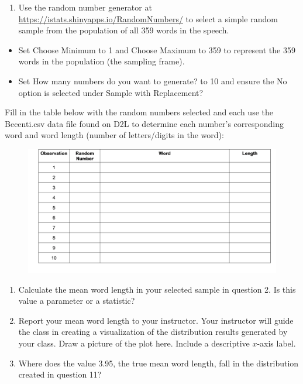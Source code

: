 \documentclass[
]{report}
\providecommand{\tightlist}{%
  \setlength{\itemsep}{0pt}\setlength{\parskip}{0pt}}
\begin{document}
\begin{enumerate}
\def\labelenumi{\arabic{enumi}.}
\setcounter{enumi}{1}
\tightlist
\item
  Use the random number generator at \url{https://istats.shinyapps.io/RandomNumbers/} to select a simple random sample from the population of all 359 words in the speech.
\end{enumerate}

\begin{itemize}
\item
  Set Choose Minimum to 1 and Choose Maximum to 359 to represent the 359 words in the population (the sampling frame).
\item
  Set How many numbers do you want to generate? to 10 and ensure the No option is selected under Sample with Replacement?
\end{itemize}

Fill in the table below with the random numbers selected and each use the Becenti.csv data file found on D2L to determine each number's corresponding word and word length (number of letters/digits in the word):

\begin{figure}

{\centering \includegraphics[width=0.5\linewidth]{images/random_word_length} 

}

\end{figure}

\begin{enumerate}
\def\labelenumi{\arabic{enumi}.}
\setcounter{enumi}{2}
\item
  Calculate the mean word length in your selected sample in question 2. Is this value a parameter or a statistic?
  \vspace{0.3in}
\item
  Report your mean word length to your instructor. Your instructor will guide the class in creating a visualization of the distribution results generated by your class. Draw a picture of the plot here. Include a descriptive \(x\)-axis label.
  \vspace{1.7in}
\item
  Where does the value 3.95, the true mean word length, fall in the distribution created in question 11?
  \vspace{0.3in}
\end{enumerate}
\end{document}
